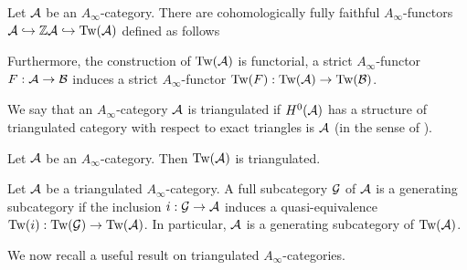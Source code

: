 \documentclass[12pt]{article}
\begin{document}
	\begin{remark}
		Let ${\cal{A}}$ be an $A_\infty$-category. There are cohomologically fully faithful $A_\infty$-functors ${\cal{A}} \hookrightarrow \mathbb{Z} {\cal{A}} \hookrightarrow \textup{Tw}({\cal{A}})$ defined as follows
		\begin{center}
		\end{center}
		Furthermore, the construction of $\textup{Tw}({\cal{A}})$ is functorial, a strict $A_\infty$-functor $F: {\cal{A}} \to {\cal{B}}$ induces a strict $A_\infty$-functor $\textup{Tw}(F): \textup{Tw}({\cal{A}}) \to \textup{Tw}({\cal{B}})$.
	\end{remark}
	
	\begin{definition}
		We say that an $A_\infty$-category ${\cal{A}}$ is triangulated if $H^0({\cal{A}})$ has a structure of triangulated category with respect to exact triangles is ${\cal{A}}$ (in the sense of \cite[Section 3h]{Sei}).
	\end{definition}
	
	\begin{proposition}{\cite[Lemma 3.28]{Sei}}
	Let ${\cal{A}}$ be an $A_\infty$-category. Then $\textup{Tw}({\cal{A}})$ is triangulated.
	\end{proposition}
	
	\begin{definition}
		\label{deftria}
		Let ${\cal{A}}$ be a triangulated $A_\infty$-category. A full subcategory ${\cal{G}}$ of ${\cal{A}}$ is a generating subcategory if the inclusion $i: {\cal{G}} \to {\cal{A}}$ induces a quasi-equivalence $\textup{Tw}(i): \textup{Tw}({\cal{G}}) \to \textup{Tw}({\cal{A}})$. In particular, ${\cal{A}}$ is a generating subcategory of $\textup{Tw}({\cal{A}})$.
	\end{definition}
	
	\noindent We now recall a useful result on triangulated $A_\infty$-categories.
	
\end{document}
